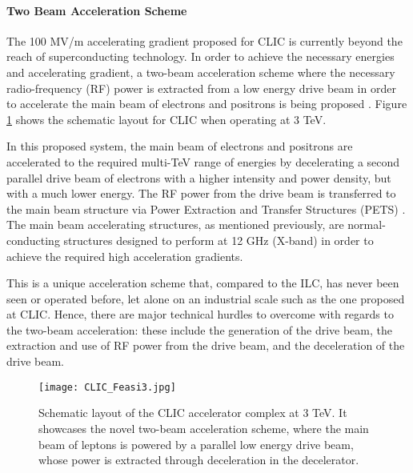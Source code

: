 \paragraph{Two Beam Acceleration Scheme}

The 100 MV/m accelerating gradient proposed for CLIC is currently beyond the reach of superconducting technology. In order to achieve the necessary energies and accelerating gradient, a two-beam acceleration scheme where the necessary radio-frequency (RF) power is extracted from a low energy drive beam in order to accelerate the main beam of electrons and positrons is being proposed \cite{AccSciTech:Wilson}. Figure \ref{fig:CLIC:Feasi3} shows the schematic layout for CLIC when operating at 3 TeV.

In this proposed system, the main beam of electrons and positrons are accelerated to the required multi-TeV range of energies by decelerating a second parallel drive beam of electrons with a higher intensity and power density, but with a much lower energy. The RF power from the drive beam is transferred to the main beam structure via Power Extraction and Transfer Structures (PETS) \cite{CLIC:Concept}. The main beam accelerating structures, as mentioned previously, are normal-conducting structures designed to perform at 12 GHz (X-band) in order to achieve the required high acceleration gradients.

This is a unique acceleration scheme that, compared to the ILC, has never been seen or operated before, let alone on an industrial scale such as the one proposed at CLIC. Hence, there are major technical hurdles to overcome with regards to the two-beam acceleration: these include the generation of the drive beam, the extraction and use of RF power from the drive beam, and the deceleration of the drive beam. \cite{CLIC:Concept}

\begin{figure}[!htb]
    \centering
    \texttt{[image: CLIC\_Feasi3.jpg]}
    
    \caption{Schematic layout of the CLIC accelerator complex at 3 TeV. It showcases the novel two-beam acceleration scheme, where the main beam of leptons is powered by a parallel low energy drive beam, whose power is extracted through deceleration in the decelerator. \cite{CLIC:Concept}}
    \label{fig:CLIC:Feasi3}
\end{figure}

